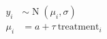 \begin{align*} y_i & \sim \operatorname N(\mu_i, \sigma) \\ \mu_i & = a + \tau\ \text{treatment}_i \end{align*}
